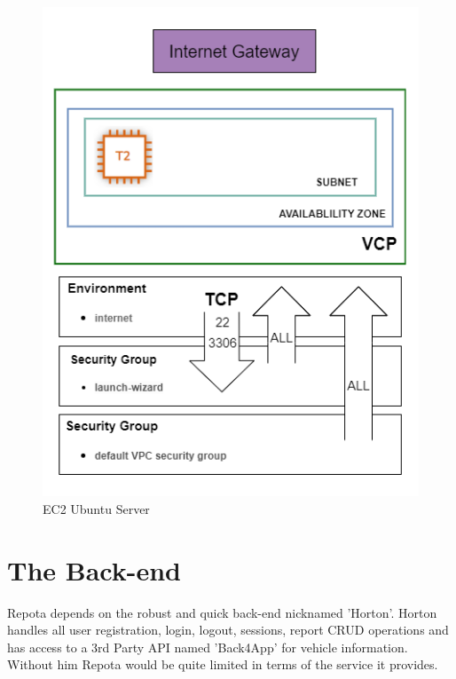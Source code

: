\begin{figure}[H]
    \caption{EC2 Ubuntu Server}
    \label{image:db_aws}
    \centering
    \includegraphics[width=1.0\textwidth]{images/aws/aws_linux.png}
\end{figure}

\newpage
\section{The Back-end}
Repota depends on the robust and quick back-end nicknamed 'Horton'. 
Horton handles all user registration, login, logout, sessions, report CRUD operations and has access to a 3rd Party API named 'Back4App' for vehicle information. Without him Repota would be quite limited in terms of the service it provides. 

